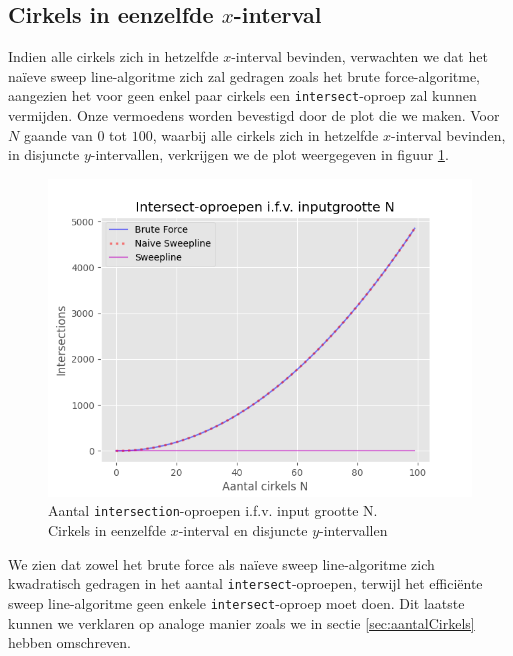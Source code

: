 \documentclass[12pt]{article}
\begin{document}
\subsection{Cirkels in eenzelfde $x$-interval}
Indien alle cirkels zich in hetzelfde $x$-interval bevinden, verwachten we dat het naïeve sweep line-algoritme zich zal gedragen zoals het brute force-algoritme, aangezien het voor geen enkel paar cirkels een \texttt{intersect}-oproep zal kunnen vermijden. Onze vermoedens worden bevestigd door de plot die we maken. Voor $N$ gaande van $0$ tot $100$, waarbij alle cirkels zich in hetzelfde $x$-interval bevinden, in disjuncte $y$-intervallen, verkrijgen we de plot weergegeven in figuur \ref{fig:CirkelsStacked}.

\begin{figure}[H]
	\centering
	\includegraphics[width=\linewidth]{../plots/IntersectionsCirkelsStacked.png}
	\caption{Aantal \texttt{intersection}-oproepen i.f.v. input grootte N.\\ Cirkels in eenzelfde $x$-interval en disjuncte $y$-intervallen}
	\label{fig:CirkelsStacked}
\end{figure}

We zien dat zowel het brute force als naïeve sweep line-algoritme zich kwadratisch gedragen in het aantal \texttt{intersect}-oproepen, terwijl het efficiënte sweep line-algoritme geen enkele \texttt{intersect}-oproep moet doen. Dit laatste kunnen we verklaren op analoge manier zoals we in sectie \ref{sec:aantalCirkels} hebben omschreven.
\end{document}
